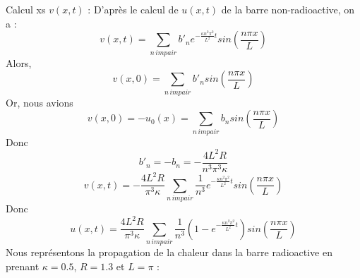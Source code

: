 \documentclass[a4paper,12pt]{report}
\begin{document}
Calcul xs $v(x,t)$ :
D'apr\`es le calcul de $u(x,t)$ de la barre non-radioactive, on a :
\begin{equation}
v(x,t)=\sum_{n\,impair}b'_{n}e^{-\frac{\kappa n^{2}\pi^{2}}{L^{2}}t}sin\left(\frac{n\pi x}{L}\right)
\end{equation}
Alors,
\begin{equation}
v(x,0)=\sum_{n\,impair}b'_{n}sin\left(\frac{n\pi x}{L}\right)
\end{equation}
Or, nous avions 
\begin{equation}
v(x,0)=-u_{0}(x)=\sum_{n\,impair}b_{n}sin\left(\frac{n\pi x}{L}\right)
\end{equation}
Donc \[b'_{n}=-b_{n}=-\frac{4L^{2}R}{n^{3}\pi^{3}\kappa}\]
\begin{equation}
v(x,t)=-\frac{4L^{2}R}{\pi^{3}\kappa}\sum_{n\,impair}\frac{1}{n^{3}}e^{-\frac{\kappa n^{2}\pi^{2}}{L^{2}}t}sin\left(\frac{n\pi x}{L}\right)
\end{equation}
Donc
\begin{equation}
u(x,t)=\frac{4L^{2}R}{\pi^{3}\kappa}\sum_{n\,impair}\frac{1}{n^{3}}(1 - e^{-\frac{\kappa n^{2}\pi^{2}}{L^{2}}t})sin\left(\frac{n\pi x}{L}\right)
\end{equation}
Nous repr\'esentons la propagation de la chaleur dans la barre radioactive en prenant $\kappa = 0.5$, $R = 1.3$ et $L = \pi$ :
\end{document}
